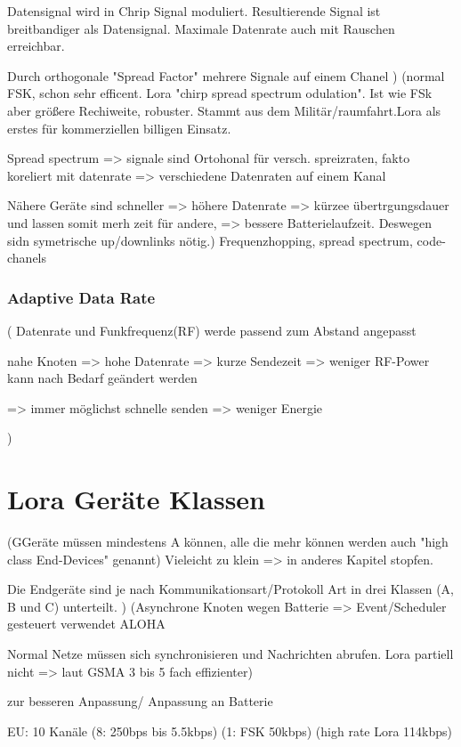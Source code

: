 \documentclass[a4paper,12pt]{article}
\begin{document}
        Datensignal wird in Chrip Signal moduliert. Resultierende Signal ist breitbandiger als Datensignal. Maximale Datenrate auch mit Rauschen erreichbar.

        Durch orthogonale "Spread Factor" mehrere Signale auf einem Chanel
    )
    \cite{WhatIsLoRa}(normal FSK, schon sehr efficent. Lora "chirp spread spectrum odulation". Ist wie FSk aber größere Rechiweite, robuster. Stammt aus dem Militär/raumfahrt.Lora als erstes für kommerziellen billigen Einsatz.
    
    Spread spectrum => signale sind Ortohonal für versch. spreizraten, fakto koreliert mit datenrate => verschiedene Datenraten auf einem Kanal
    
    Nähere Geräte sind schneller => höhere Datenrate => kürzee übertrgungsdauer und lassen somit merh zeit für andere, => bessere Batterielaufzeit. Deswegen sidn symetrische up/downlinks nötig.)
    Frequenzhopping, spread spectrum, code-chanels
    \subsubsection{Adaptive Data Rate}
    \cite{LoraLimit}(
        Datenrate und Funkfrequenz(RF) werde passend zum Abstand angepasst

        nahe Knoten => hohe Datenrate => kurze Sendezeit => weniger RF-Power
        kann nach Bedarf geändert werden

        => immer möglichst schnelle senden => weniger Energie

    )
    \section{Lora Geräte Klassen}
    \cite{LoRaSpec}(GGeräte müssen mindestens A können, alle die mehr können werden auch "high class End-Devices" genannt)
    Vieleicht zu klein => in anderes Kapitel stopfen.

    Die Endgeräte sind je nach Kommunikationsart/Protokoll Art in drei Klassen (A, B und C) unterteilt. 
   )
        \cite{RFC8376}
        \cite{LoraClasses}
        \cite{WhatIsLoRa}(Asynchrone Knoten wegen Batterie => Event/Scheduler gesteuert verwendet ALOHA
        
        Normal Netze müssen sich synchronisieren und Nachrichten abrufen. Lora partiell nicht => laut GSMA 3 bis 5 fach effizienter)
    
        zur besseren Anpassung/ Anpassung an Batterie
        
        EU: 10 Kanäle (8: 250bps bis 5.5kbps) (1: FSK 50kbps) (high rate Lora 114kbps)
\end{document}
